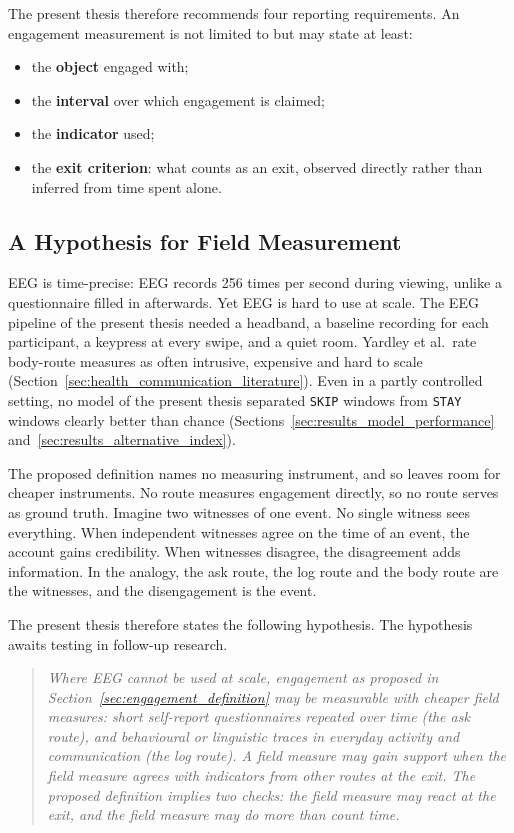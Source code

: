 \documentclass[12pt,a4paper]{report}
\begin{document}
The present thesis therefore recommends four reporting requirements. An engagement measurement is not limited to but may state at least:
\begin{itemize}
    \item the \textbf{object} engaged with;
    \item the \textbf{interval} over which engagement is claimed;
    \item the \textbf{indicator} used;
    \item the \textbf{exit criterion}: what counts as an exit, observed directly rather than inferred from time spent alone.
\end{itemize}

\subsection{A Hypothesis for Field Measurement}
\label{sec:engagement_bridge}

EEG is time-precise: EEG records 256 times per second during viewing, unlike a questionnaire filled in afterwards. Yet EEG is hard to use at scale. The EEG pipeline of the present thesis needed a headband, a baseline recording for each participant, a keypress at every swipe, and a quiet room. Yardley et al.\ rate body-route measures as often intrusive, expensive and hard to scale (Section~\ref{sec:health_communication_literature}). Even in a partly controlled setting, no model of the present thesis separated \texttt{SKIP} windows from \texttt{STAY} windows clearly better than chance (Sections~\ref{sec:results_model_performance} and~\ref{sec:results_alternative_index}).

The proposed definition names no measuring instrument, and so leaves room for cheaper instruments. No route measures engagement directly, so no route serves as ground truth. Imagine two witnesses of one event. No single witness sees everything. When independent witnesses agree on the time of an event, the account gains credibility. When witnesses disagree, the disagreement adds information. In the analogy, the ask route, the log route and the body route are the witnesses, and the disengagement is the event.

The present thesis therefore states the following hypothesis. The hypothesis awaits testing in follow-up research.

\begin{quote}
\emph{Where EEG cannot be used at scale, engagement as proposed in Section~\ref{sec:engagement_definition} may be measurable with cheaper field measures: short self-report questionnaires repeated over time (the ask route), and behavioural or linguistic traces in everyday activity and communication (the log route). A field measure may gain support when the field measure agrees with indicators from other routes at the exit. The proposed definition implies two checks: the field measure may react at the exit, and the field measure may do more than count time.}
\end{quote}
\end{document}
